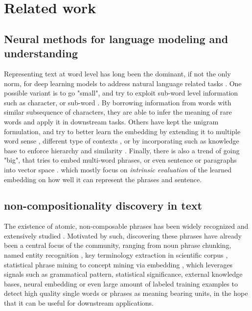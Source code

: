 

\section{Related work}
\subsection{Neural methods for language modeling and understanding}
Representing text at word level has long been the dominant, if not the only norm, for deep learning models to address natural language related  tasks  \cite{collobert2011natural, wu2016google, conneau2017very, severyn2015learning}. 
One possible variant is to go "small", and try to exploit sub-word level information such as character, or sub-word \cite{wieting2016charagram, bojanowski2016enriching, pinter2017mimicking}. By borrowing information from words with similar subsequence of characters, they are able to infer the meaning of rare words and apply it in downstream tasks. 
Others have kept the unigram formulation, and try to better learn the embedding by extending it to multiple word sense \cite{neelakantan2015efficient, athiwaratkun2017multimodal}, 
different type of contexts \cite{levy2014dependency, melamud2016role}, 
or by incorporating such as knowledge base to enforce hierarchy and similarity \cite{nickel2017poincare, faruqui2014retrofitting}. 
Finally, there is also a trend of going "big", that tries to embed multi-word phrases, or even sentence or paragraphs into vector space \cite{mikolov2013distributed, hill2015dictionary, arora2016simple}. 
which mostly focus on \emph{intrinsic evaluation} of the learned embedding on how well it can represent the phrases and sentence.

\subsection{non-compositionality discovery in text}
The existence of atomic, non-composable phrases has been widely recognized and extensively studied \cite{sag2002multiword, baldwin2010multiword, constant2017multiword, hashimoto2016adaptive}. 
Motivated by such, discovering these phrases have already been a central focus of the community, 
ranging from noun phrase chunking, named entity recognition \cite{nadeau2007survey, baldwin2010multiword, pecina2006combining, sporleder2009unsupervised, hashimoto2008construction},
key terminology extraction in scientific corpus \cite{beliga2015overview, zhang2008comparative}, statistical phrase mining \cite{segphrase, autophrase} to concept mining via embedding \cite{li2018concept}, 
which leverages signals such as grammatical pattern, statistical significance, external knowledge bases, neural embedding or even large amount of labeled training examples to detect high quality single words or phrases as meaning bearing units, in the hope that it can be useful for downstream applications.


